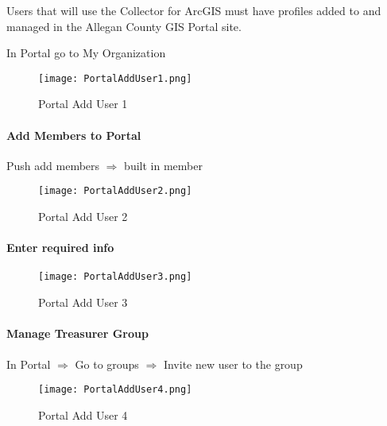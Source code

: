 \documentclass[class=book , crop=false, titlepage, twoside, multi={itemize, figure, verbatim}, float=false]{standalone}
\begin{document}
\noindent Users that will use the Collector for ArcGIS must have profiles added to and managed in the Allegan County GIS Portal site.
\vspace{.5in}

In Portal go to My Organization
%
%
\begin{figure}[h!]
\centering
    \texttt{[image: PortalAddUser1.png]}
\caption{Portal Add User 1}
\end{figure}
\clearpage
%
%
%
\paragraph[Add Members to Portal]{\Large Add Members to Portal\texorpdfstring{\\}{}}
\vspace{.5in}

Push add members $\Rightarrow$ built in member
\vspace{.5in}

%
%
\begin{figure}[h!]
\centering
    \texttt{[image: PortalAddUser2.png]}
\caption{Portal Add User 2}
\end{figure}
\clearpage
%
%
%
\paragraph[Enter required info]{\Large Enter required info\texorpdfstring{\\}{}}

\vspace{.5in}

%
%
\begin{figure}[h!]
\centering
    \texttt{[image: PortalAddUser3.png]}
\caption{Portal Add User 3}
\end{figure}
\clearpage
%
%
%
\paragraph[Manage Treasurer Group]{\Large Manage Treasurer Group\texorpdfstring{\\}{}}
\vspace{.5in}

In Portal $\Rightarrow$ Go to groups $\Rightarrow$ Invite new user to the group
\vspace{.5in}

%
%
\begin{figure}[h!]
\centering
    \texttt{[image: PortalAddUser4.png]}
\caption{Portal Add User 4}
\end{figure}
\clearpage
%
%
%
\end{document}
